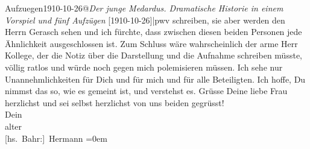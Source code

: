 \begin{ledgroupsized}[t]{13cm}
{                  Aufzuegen1910-10-26@\strich\emph{Der junge Medardus. Dramatische Historie in einem Vorspiel und fünf Aufzügen} {[}1910-10-26{]}|pwv} schreiben, sie aber werden den
               Herrn Gerasch sehen und ich fürchte, dass
               zwischen diesen beiden Personen jede Ähnlichkeit ausgeschlossen ist. Zum Schluss wäre
               wahrscheinlich der arme Herr Kollege, der die Notiz über die Darstellung und die
               Aufnahme schreiben müsste, völlig ratlos und würde noch gegen mich polemisieren {\pb}müssen. Ich sehe nur Unannehmlichkeiten für Dich
               und für mich und für alle Beteiligten. Ich hoffe, Du nimmst das so, wie es gemeint
               ist, und verstehst es.\pend
           \pstart
           Grüsse Deine liebe Frau
               herzlichst und sei selbst herzlichst von uns beiden gegrüsst!{\\[\baselineskip]}Dein{\\[\baselineskip]}alter{\\[\baselineskip]}\spacefill\mbox{{[}hs. Bahr:{]} Hermann}\pend
           \leftskip=0em{}
         
         \endnumbering{}\end{ledgroupsized}  \newcommand{\dateiname}{L01980}\newcommand{\titel}{Hermann Bahr an Arthur Schnitzler, 15. 11. 1910}\newcommand{\editorInnen}{ Kurt Ifkovits,  Martin Anton Müller}
      